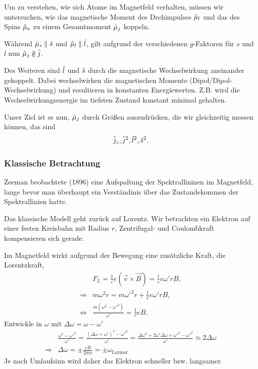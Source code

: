 Um zu verstehen, wie sich Atome im Magnetfeld verhalten, müssen wir untersuchen,
wie das magnetische Moment des Drehimpulses $\hat{\boldmath{\mu}}_l$ und das des
Spins $\hat{\boldmath{\mu}}_s$ zu einem Gesamtmoment $\hat{\boldmath{\mu}}_j$ koppeln.

Während $\hat{\boldmath{\mu}}_s\parallel \hat{\boldmath{s}}$ und $\hat{\boldmath{\mu}}_l\parallel \hat{\boldmath{l}}$, gilt
aufgrund der verschiedenen $g$-Faktoren für $s$ und $l$ nun
$\hat{\boldmath{\mu}}_j\nparallel \hat{\boldmath{j}}$.

Des Weiteren sind $\hat{\boldmath{l}}$ und $\hat{\boldmath{s}}$ durch die magnetische
Wechselwirkung aneinander gekoppelt. Dabei wechselwirken die 
magnetischen Momente (Dipol/Dipol-Wechselwirkung) und resultieren in konstanten
Energiewerten. Z.B. wird die Wechselwirkungsenergie im tiefsten Zustand
konstant minimal gehalten.

Unser Ziel ist es nun, $\hat{\boldmath{\mu}}_j$ durch Größen auszudrücken, die wir
gleichzeitig messen können, das sind
\begin{align*}
\hat{\boldmath{j}}_z, \hat{\boldmath{j}}^2, \hat{\boldmath{l}}^2, \hat{\boldmath{s}}^2.
\end{align*}

\subsubsection{Klassische Betrachtung}

Zeeman beobachtete (1896) eine Aufspaltung der Spektrallininen im Magnetfeld,
lange bevor man überhaupt ein Verständinis über das Zustandekommen der
Spektrallinien hatte.

Das klassische Modell geht zurück auf Lorentz. Wir betrachten ein Elektron auf
einer festen Kreisbahn mit Radius $r$, Zentrifugal- und Coulombkraft
kompensieren sich gerade.

Im Magnetfeld wirkt aufgrund der Bewegung eine zusätzliche Kraft, die
Lorentzkraft,
\begin{align*}
&F_L = \frac{1}{c}e\left(\vec{v}\times \vec{B}\right) = \frac{1}{c}e\omega' r
B,\\
\Rightarrow & m\omega^2 r = m\omega'^2r + \frac{1}{c} e \omega' rB,\\
\Leftrightarrow & \frac{m\left(\omega^2 - \omega'^2 \right)}{\omega'} =
\frac{1}{c}eB.
\end{align*}
Entwickle in $\omega$ mit $\Delta \omega = \omega - \omega'$
\begin{align*}
&\frac{\omega^2 - \omega'^2}{\omega'} = 
\frac{\left(\Delta\omega + \omega'\right)^2 - \omega'^2}{\omega'}
= \frac{\Delta \omega^2 + 2\omega'\Delta\omega + \omega'^2 -
\omega'^2}{\omega'}
\approx 2\Delta \omega\\
\Rightarrow &\Delta \omega = \pm \frac{eB}{2mc} = \pm
\omega_{\text{Larmor}}
\end{align*}
Je nach Umlaufsinn wird daher das Elektron schneller bzw. langsamer.

